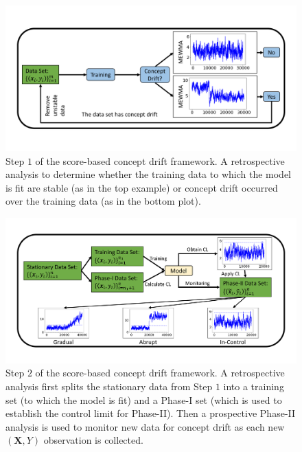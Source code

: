 \documentclass[twoside,11pt]{article}
\begin{document}
\begin{figure}[!htbp]
\centering
\includegraphics[width = 1\linewidth, trim=.35in .69in .35in .69in, clip]{../figures/v14/flow_chart/Retrospective_1.png}
\caption{Step $1$ of the score-based concept drift framework. A retrospective analysis to determine whether the training data to which the model is fit are stable (as in the top example) or concept drift occurred over the training data (as in the bottom plot).}
  \label{fig:proc_mon_score_retro}
\end{figure}

\begin{figure}
\centering
\includegraphics[width = 1\linewidth, trim=.35in .49in .35in .49in, clip]{../figures/v14/flow_chart/Monitoring_1.png}
\caption{Step $2$ of the score-based concept drift framework. A retrospective analysis first splits the stationary data from Step $1$ into a training set (to which the model is fit) and a Phase-I set (which is used to establish the control limit for Phase-II). Then a prospective Phase-II analysis is used to monitor new data for concept drift as each new $(\bm{X}, Y)$ observation is collected.}
\label{fig:proc_mon_score_monitoring}
\end{figure}
\end{document}
